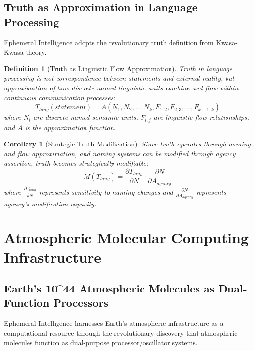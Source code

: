 \documentclass[12pt,a4paper]{article}
\newtheorem{definition}{Definition}
\newtheorem{corollary}{Corollary}
\begin{document}
\subsection{Truth as Approximation in Language Processing}

Ephemeral Intelligence adopts the revolutionary truth definition from Kwasa-Kwasa theory.

\begin{definition}[Truth as Linguistic Flow Approximation]
Truth in language processing is not correspondence between statements and external reality, but approximation of how discrete named linguistic units combine and flow within continuous communication processes:
\begin{equation}
T_{lang}(statement) = A(N_1, N_2, \ldots, N_k, F_{1,2}, F_{2,3}, \ldots, F_{k-1,k})
\end{equation}
where $N_i$ are discrete named semantic units, $F_{i,j}$ are linguistic flow relationships, and $A$ is the approximation function.
\end{definition}

\begin{corollary}[Strategic Truth Modification]
Since truth operates through naming and flow approximation, and naming systems can be modified through agency assertion, truth becomes strategically modifiable:
\begin{equation}
M(T_{lang}) = \frac{\partial T_{lang}}{\partial N} \cdot \frac{\partial N}{\partial A_{agency}}
\end{equation}
where $\frac{\partial T_{lang}}{\partial N}$ represents sensitivity to naming changes and $\frac{\partial N}{\partial A_{agency}}$ represents agency's modification capacity.
\end{corollary}

\section{Atmospheric Molecular Computing Infrastructure}

\subsection{Earth's 10^44 Atmospheric Molecules as Dual-Function Processors}

Ephemeral Intelligence harnesses Earth's atmospheric infrastructure as a computational resource through the revolutionary discovery that atmospheric molecules function as dual-purpose processor/oscillator systems.
\end{document}
